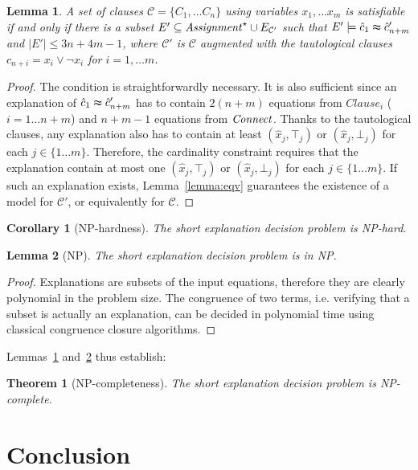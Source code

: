 \documentclass{easychair}
\newtheorem{corollary}{Corollary}
\newtheorem{theorem}{Theorem}
\newtheorem{lemma}{Lemma}
\begin{document}

\begin{lemma}
A set of clauses $\mathcal{C}= \{C_1, \dots C_n\}$ using variables $x_1,\dots
x_m$ is satisfiable if and only if there is a subset $E' \subseteq
{\it Assignment}^\star \cup E_{\mathcal{C}'}$ such that $E'\models \hat{c}_1
\thickapprox \hat{c}'_{n+m}$ and $|E'| \leq 3n+4m-1$, where $\mathcal{C}'$ is
$\mathcal{C}$ augmented with the tautological clauses $c_{n+i} = x_i \vee \neg
x_i$ for $i=1,\dots m$.
\end{lemma}
\begin{proof}
The condition is straightforwardly necessary.  It is also sufficient since an
explanation of $\hat{c}_1 \thickapprox \hat{c}'_{n+m}$ has to contain $2(n + m)$
equations from $Clause_i$ ($i= 1\dots n + m$) and $n + m - 1$ equations from
${\it Connect}$.  Thanks to the tautological clauses, any explanation also has to
contain at least $(\hat{x}_j,\top_j)$ or $(\hat{x}_j,\bot_j)$ for each
$j\in\{1\dots m\}$. Therefore, the cardinality constraint requires that the explanation
contain at most one $(\hat{x}_j,\top_j)$ or $(\hat{x}_j,\bot_j)$ for each
$j\in\{1\dots m\}$.  If such an explanation exists, Lemma~\ref{lemma:eqv}
guarantees the existence of a model for $\mathcal{C'}$, or equivalently for
$\mathcal{C}$.
\end{proof}




\begin{corollary}[NP-hardness]
\label{lemma:nphardness}
The short explanation decision problem is NP-hard.
\end{corollary}

\begin{lemma}[NP]
\label{lemma:innp}
The short explanation decision problem is in NP.
\end{lemma}
\begin{proof}
Explanations are subsets of the input equations, therefore they are clearly
polynomial in the problem size.  The congruence of two terms, i.e. verifying
that a subset is actually an explanation, can be decided in polynomial
time using classical congruence closure algorithms.
\end{proof}

Lemmas~\ref{lemma:nphardness} and~\ref{lemma:innp} thus establish:

\begin{theorem}[NP-completeness]
The short explanation decision problem is NP-complete.
\end{theorem}

\section*{Conclusion}
\end{document}
